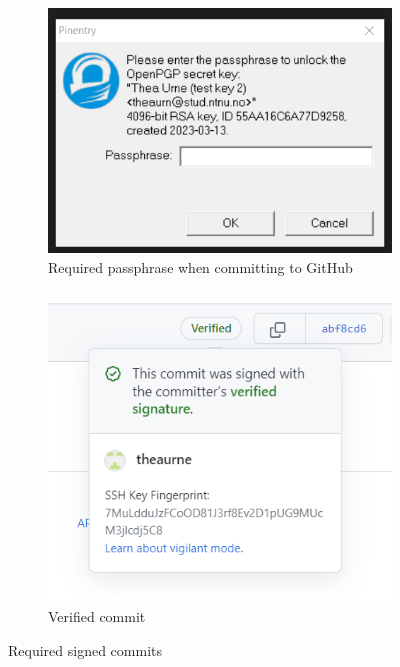 \begin{figure}
  \centering
  \begin{subfigure}[H]{0.4\textwidth}
    \includegraphics[width=\textwidth]{Images/signedcommits.png}
    \caption{Required passphrase when committing to GitHub}
    \label{fig:image1}
  \end{subfigure}
  \hfill
  \begin{subfigure}[H]{0.4\textwidth}
    \includegraphics[width=\textwidth]{Images/verified-commit.png}
    \caption{Verified commit}
    \label{fig:image2}
  \end{subfigure}
  \caption{Required signed commits}
  \label{fig:overall}
\end{figure}

